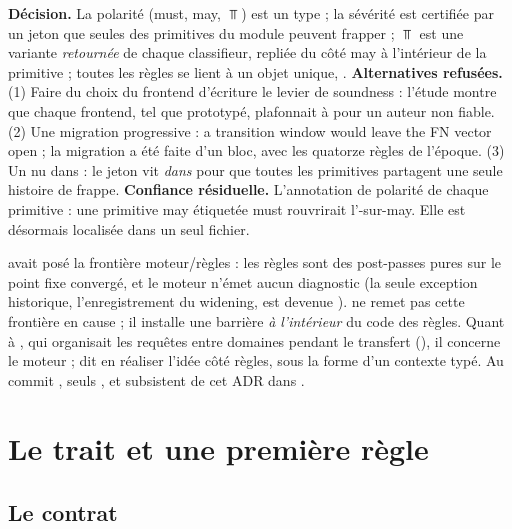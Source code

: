 \begin{decision}
\textbf{Décision.} La polarité (must, may, $\Top$) est un type ; la sévérité \Error{} est certifiée par un jeton que seules des primitives du module  peuvent frapper ; $\Top$ est une variante \emph{retournée} de chaque classifieur, repliée du côté may à l'intérieur de la primitive ; toutes les règles se lient à un objet unique, .
\textbf{Alternatives refusées.} (1) Faire du choix du frontend d'écriture le levier de soundness : l'étude montre que chaque frontend, tel que prototypé, plafonnait à \Warning{} pour un auteur non fiable. (2) Une migration progressive : \og a transition window would leave the FN vector open\fg{} ; la migration a été faite d'un bloc, avec les quatorze règles de l'époque. (3) Un  nu dans  : le jeton vit \emph{dans}  pour que toutes les primitives partagent une seule histoire de frappe.
\textbf{Confiance résiduelle.} L'annotation de polarité de chaque primitive : une primitive may étiquetée must rouvrirait l'\Error-sur-may. Elle est désormais localisée dans un seul fichier.
\end{decision}

\begin{remarque}
 avait posé la frontière moteur/règles : les règles sont des post-passes pures sur le point fixe convergé, et le moteur n'émet aucun diagnostic (la seule exception historique, l'enregistrement du widening, est devenue ).  ne remet pas cette frontière en cause ; il installe une barrière \emph{à l'intérieur} du code des règles. Quant à , qui organisait les requêtes entre domaines pendant le transfert (), il concerne le moteur ;  dit en réaliser l'idée côté règles, sous la forme d'un contexte typé. Au commit \snapshotCommit, seuls ,  et  subsistent de cet ADR dans .
\end{remarque}

\section{Le trait  et une première règle}
\label{sec:api-regles-trait}

\subsection{Le contrat}

